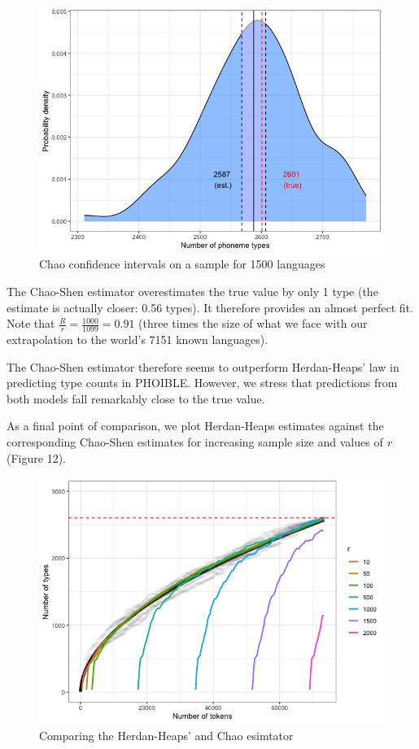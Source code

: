 \documentclass[
]{article}
\begin{document}
\begin{figure}

{\centering \includegraphics[width=0.8\linewidth]{README_files/figure-gfm/chao_ci-1} 

}

\caption{\label{fig:chao_ci}Chao confidence intervals on a sample for 1500 languages}\label{fig:chao_ci}
\end{figure}

The Chao-Shen estimator overestimates the true value by only 1 type (the
estimate is actually closer: 0.56 types). It therefore provides an
almost perfect fit. Note that \(\frac{R}{r} = \frac{1000}{1099} = 0.91\)
(three times the size of what we face with our extrapolation to the
world's 7151 known languages).

The Chao-Shen estimator therefore seems to outperform Herdan-Heaps' law
in predicting type counts in PHOIBLE. However, we stress that
predictions from both models fall remarkably close to the true value.

As a final point of comparison, we plot Herdan-Heaps estimates against
the corresponding Chao-Shen estimates for increasing sample size and
values of \emph{r} (Figure 12).

\begin{figure}

{\centering \includegraphics[width=0.8\linewidth]{README_files/figure-gfm/comp_plot-1} 

}

\caption{\label{fig:comp_plot}Comparing the Herdan-Heaps' and Chao esimtator}\label{fig:comp_plot}
\end{figure}
\end{document}
